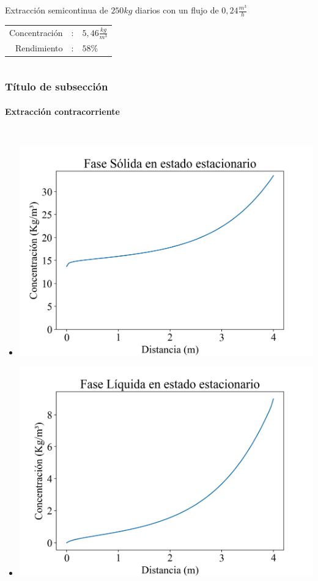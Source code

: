 \documentclass[aspectratio=1610]{beamer}
\newcommand{\ssec}{Título de subsección}
\begin{document}
\begin{frame}
\begin{columns}
		\begin{center}
		\tiny{
		Extracción semicontinua de $250 kg$ diarios con un flujo de $0,24 \frac{m^3}{h}$\\}
		\begin{tabular}{rcl}
		Concentración &:& $5,46 \frac{kg}{m^3}$ \\
		Rendimiento &:& $58\%$ \\
		\end{tabular}
		\end{center}
	\end{columns}
\end{frame}
\begin{frame}
	\frametitle{\ssec}
	\framesubtitle{Extracción contracorriente}
	\begin{columns}
		\begin{itemize}
		\setlength\itemsep{-0.5em}
		\item[] \includegraphics[height=0.35\textheight]{figs/model-contracorriente-concentracion-solida.png}
		\item[] \includegraphics[height=0.35\textheight]{figs/model-contracorriente-concentracion-liquida.png}

\end{itemize}
\end{columns}
\end{frame}
\end{document}
